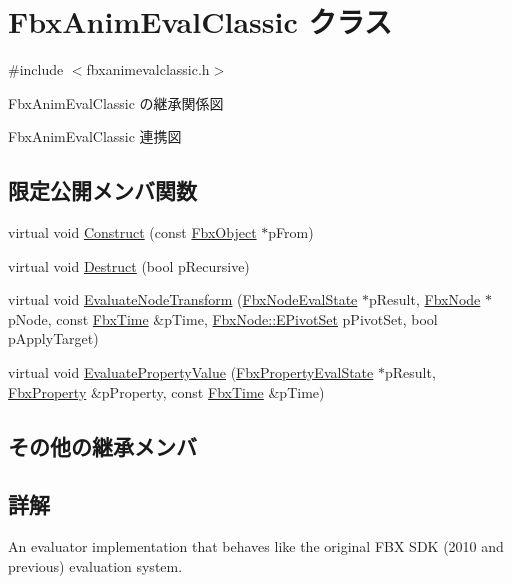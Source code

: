 \hypertarget{class_fbx_anim_eval_classic}{}\section{Fbx\+Anim\+Eval\+Classic クラス}
\label{class_fbx_anim_eval_classic}


{\ttfamily \#include $<$fbxanimevalclassic.\+h$>$}



Fbx\+Anim\+Eval\+Classic の継承関係図


Fbx\+Anim\+Eval\+Classic 連携図
\subsection*{限定公開メンバ関数}
\begin{DoxyCompactItemize}
\item 
virtual void \hyperlink{class_fbx_anim_eval_classic_a9b0ca916c170485271aa2ba23d38019a}{Construct} (const \hyperlink{class_fbx_object}{Fbx\+Object} $\ast$p\+From)
\item 
virtual void \hyperlink{class_fbx_anim_eval_classic_a308a42f3bd439a3e36f3b5171d5fc092}{Destruct} (bool p\+Recursive)
\item 
virtual void \hyperlink{class_fbx_anim_eval_classic_a83f7c6d89964e4ff48e7ad2d325a1eac}{Evaluate\+Node\+Transform} (\hyperlink{class_fbx_node_eval_state}{Fbx\+Node\+Eval\+State} $\ast$p\+Result, \hyperlink{class_fbx_node}{Fbx\+Node} $\ast$p\+Node, const \hyperlink{class_fbx_time}{Fbx\+Time} \&p\+Time, \hyperlink{class_fbx_node_ae62b7311ac4727654cdf1ebd5cbf7343}{Fbx\+Node\+::\+E\+Pivot\+Set} p\+Pivot\+Set, bool p\+Apply\+Target)
\item 
virtual void \hyperlink{class_fbx_anim_eval_classic_a3618b50c5fd35f18f5e6f873ca07cf2e}{Evaluate\+Property\+Value} (\hyperlink{class_fbx_property_eval_state}{Fbx\+Property\+Eval\+State} $\ast$p\+Result, \hyperlink{class_fbx_property}{Fbx\+Property} \&p\+Property, const \hyperlink{class_fbx_time}{Fbx\+Time} \&p\+Time)
\end{DoxyCompactItemize}
\subsection*{その他の継承メンバ}


\subsection{詳解}
An evaluator implementation that behaves like the original F\+BX S\+DK (2010 and previous) evaluation system.

